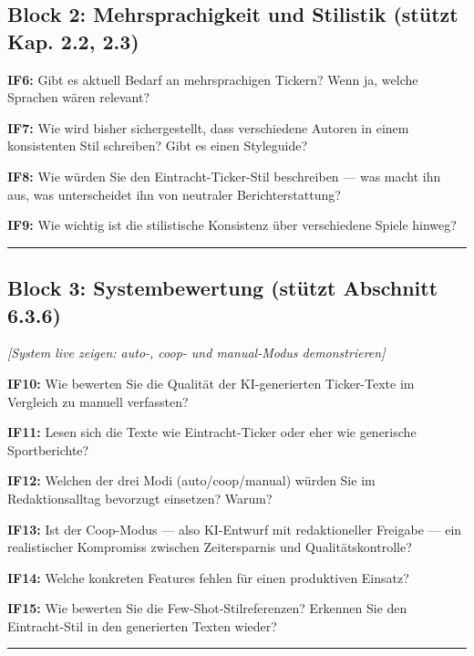 \subsection{Block 2: Mehrsprachigkeit und Stilistik (stützt Kap. 2.2,
2.3)}\label{block-2-mehrsprachigkeit-und-stilistik-stuxfctzt-kap.-2.2-2.3}

\textbf{IF6:} Gibt es aktuell Bedarf an mehrsprachigen Tickern? Wenn ja,
welche Sprachen wären relevant?

\textbf{IF7:} Wie wird bisher sichergestellt, dass verschiedene Autoren
in einem konsistenten Stil schreiben? Gibt es einen Styleguide?

\textbf{IF8:} Wie würden Sie den Eintracht-Ticker-Stil beschreiben ---
was macht ihn aus, was unterscheidet ihn von neutraler
Berichterstattung?

\textbf{IF9:} Wie wichtig ist die stilistische Konsistenz über
verschiedene Spiele hinweg?

\begin{center}\rule{0.5\linewidth}{0.5pt}\end{center}

\subsection{Block 3: Systembewertung (stützt Abschnitt
6.3.6)}\label{block-3-systembewertung-stuxfctzt-abschnitt-6.3.6}

\emph{{[}System live zeigen: auto-, coop- und manual-Modus
demonstrieren{]}}

\textbf{IF10:} Wie bewerten Sie die Qualität der KI-generierten
Ticker-Texte im Vergleich zu manuell verfassten?

\textbf{IF11:} Lesen sich die Texte wie Eintracht-Ticker oder eher wie
generische Sportberichte?

\textbf{IF12:} Welchen der drei Modi (auto/coop/manual) würden Sie im
Redaktionsalltag bevorzugt einsetzen? Warum?

\textbf{IF13:} Ist der Coop-Modus --- also KI-Entwurf mit redaktioneller
Freigabe --- ein realistischer Kompromiss zwischen Zeitersparnis und
Qualitätskontrolle?

\textbf{IF14:} Welche konkreten Features fehlen für einen produktiven
Einsatz?

\textbf{IF15:} Wie bewerten Sie die Few-Shot-Stilreferenzen? Erkennen
Sie den Eintracht-Stil in den generierten Texten wieder?

\begin{center}\rule{0.5\linewidth}{0.5pt}\end{center}


